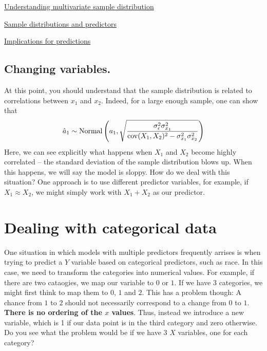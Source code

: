 \begin{exercise}
\href{https://colab.research.google.com/drive/1oIRgP_7-c5DGV1D2iz5nj406mZfJxUIG#scrollTo=h_vbLZqWPNzD&line=1&uniqifier=1}{Understanding multivariate sample distribution}
\end{exercise}

\begin{exercise}
\href{https://colab.research.google.com/drive/1oIRgP_7-c5DGV1D2iz5nj406mZfJxUIG#scrollTo=SugKDnavWgtU&line=3&uniqifier=1}{Sample distributions and predictors}
\end{exercise}

\begin{exercise}
\href{https://colab.research.google.com/drive/1oIRgP_7-c5DGV1D2iz5nj406mZfJxUIG#scrollTo=SugKDnavWgtU&line=3&uniqifier=1}{Implications for predictions}
\end{exercise}

\subsection{Changing variables. }  
At this point, you should understand that the sample distribution is related to correlations between $x_1$ and $x_2$. Indeed, for a large enough sample, one can show that
\begin{equation}
\hat{a}_1 \sim {\rm Normal}\left( a_1,\sqrt{ \frac{\sigma_{\epsilon}^2\sigma_{x_1}^2}{{ \rm cov}(X_1,X_2)^2 -\sigma_{x_1}^2\sigma_{x_2}^2 }}\right)
\end{equation} 
Here, we can see explicitly what happens when $X_1$ and $X_2$ become highly correlated -- the standard deviation of the sample distribution blows up. When this happens, we will say the model is {\dfn sloppy}. How do we deal with this situation? One approach is to use different predictor variables, for example, if $X_1 \approx X_2$, we might simply work with $X_1 + X_2$ as our predictor.




\section{Dealing with categorical data}
One situation in which models with multiple predictors frequently arrises is when trying to predict a $Y$ variable based on categorical predictors, such as race. In this case, we need to transform the categories  into numerical values. For example, if there are two cataogies, we map our variable to $0$ or $1$. If we have $3$ categories, we might first think to map them to $0$, $1$ and $2$. This has a problem though: A chance from $1$ to $2$ should not necessarily  correspond to a change from $0$ to $1$. {\bf There is no ordering of the $x$ values}. Thus, instead we introduce a new variable, which is 1 if our data point is in the third category and zero otherwise. Do you see what the problem would be if we have $3$ $X$ variables, one for each category? 

